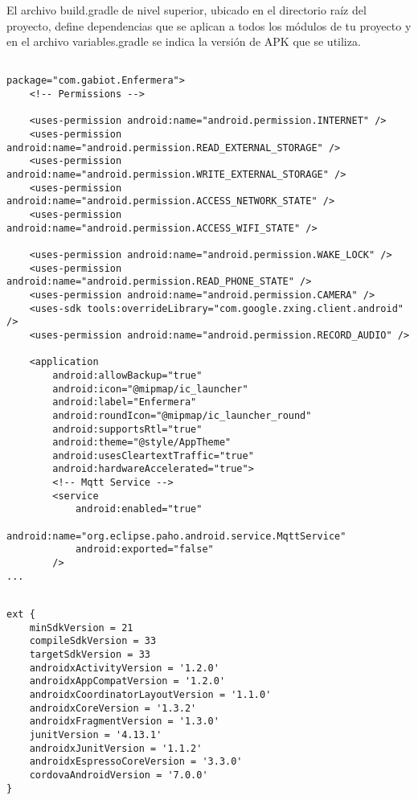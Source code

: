 El archivo build.gradle de nivel superior, ubicado en el directorio raíz del proyecto, define dependencias que se aplican a todos los módulos de tu proyecto y en el archivo variables.gradle se indica la versión de APK que se utiliza. 

\begin{lstlisting}[label=cod:AndroidMan,caption=Modificaciones al Android Manifest.]  % Start your code-block

package="com.gabiot.Enfermera">
    <!-- Permissions -->

    <uses-permission android:name="android.permission.INTERNET" />
    <uses-permission android:name="android.permission.READ_EXTERNAL_STORAGE" />
    <uses-permission android:name="android.permission.WRITE_EXTERNAL_STORAGE" />
    <uses-permission android:name="android.permission.ACCESS_NETWORK_STATE" />
    <uses-permission android:name="android.permission.ACCESS_WIFI_STATE" />

    <uses-permission android:name="android.permission.WAKE_LOCK" />
    <uses-permission android:name="android.permission.READ_PHONE_STATE" />
    <uses-permission android:name="android.permission.CAMERA" />
    <uses-sdk tools:overrideLibrary="com.google.zxing.client.android" />
    <uses-permission android:name="android.permission.RECORD_AUDIO" />

    <application
        android:allowBackup="true"
        android:icon="@mipmap/ic_launcher"
        android:label="Enfermera"
        android:roundIcon="@mipmap/ic_launcher_round"
        android:supportsRtl="true"
        android:theme="@style/AppTheme"
        android:usesCleartextTraffic="true"
        android:hardwareAccelerated="true">
        <!-- Mqtt Service -->
        <service
            android:enabled="true"
            android:name="org.eclipse.paho.android.service.MqttService"
            android:exported="false"
        />
...

\end{lstlisting}


\begin{lstlisting}[label=cod:variablesGradle,caption= Archivo variables.gradle.]  

ext {
    minSdkVersion = 21
    compileSdkVersion = 33
    targetSdkVersion = 33
    androidxActivityVersion = '1.2.0'
    androidxAppCompatVersion = '1.2.0'
    androidxCoordinatorLayoutVersion = '1.1.0'
    androidxCoreVersion = '1.3.2'
    androidxFragmentVersion = '1.3.0'
    junitVersion = '4.13.1'
    androidxJunitVersion = '1.1.2'
    androidxEspressoCoreVersion = '3.3.0'
    cordovaAndroidVersion = '7.0.0'
}

\end{lstlisting}

